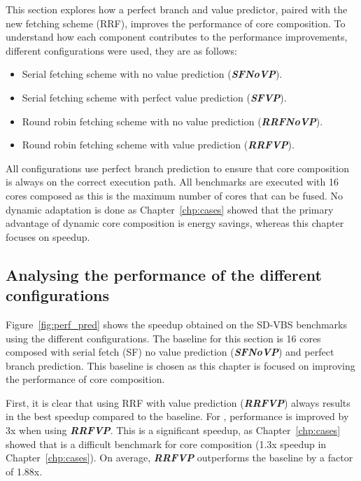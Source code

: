 \newcommand{\novp}{\textit{\textbf{SFNoVP}}}
\newcommand{\vp}{\textit{\textbf{SFVP}}}
\newcommand{\nfnovp}{\textit{\textbf{RRFNoVP}}}
\newcommand{\nfvp}{\textit{\textbf{RRFVP}}}

\newcommand{\optvp}{\textit{\textbf{OptVP}}}
\newcommand{\vt}{\textit{\textbf{VT}}}
\newcommand{\nfvt}{\textit{\textbf{RFVT}}}
\vspace{-1em}

This section explores how a perfect branch and value predictor, paired with the new fetching scheme (RRF), improves the performance of core composition.
To understand how each component contributes to the performance improvements, different configurations were used, they are as follows:
\begin{itemize}
\item Serial fetching scheme with no value prediction (\novp).
\vspace{-1em}
\item Serial fetching scheme with perfect value prediction (\vp).
\vspace{-1em}
\item Round robin fetching scheme with no value prediction (\nfnovp).
\vspace{-1em}
\item Round robin fetching scheme with value prediction (\nfvp).
\end{itemize}

All configurations use perfect branch prediction  to ensure that core composition is always on the correct execution path.
All benchmarks are executed with 16 cores composed as this is the maximum number of cores that can be fused.
No dynamic adaptation is done as Chapter~\ref{chp:cases} showed that the primary advantage of dynamic core composition is energy savings, whereas this chapter focuses on speedup.


\subsection{Analysing the performance of the different configurations}
Figure~\ref{fig:perf_pred} shows the speedup obtained on the SD-VBS benchmarks using the different configurations.
The baseline for this section is 16 cores composed with serial fetch (SF) no value prediction (\novp) and perfect branch prediction.
This baseline is chosen as this chapter is focused on improving the performance of core composition.

First, it is clear that using RRF with value prediction (\nfvp) always results in the best speedup compared to the baseline.
For , performance is improved by 3x when using \nfvp.
This is a significant speedup, as Chapter~\ref{chp:cases} showed that  is a difficult benchmark for core composition (1.3x speedup in Chapter~\ref{chp:cases}).
On average, \nfvp{} outperforms the baseline by a factor of 1.88x.

